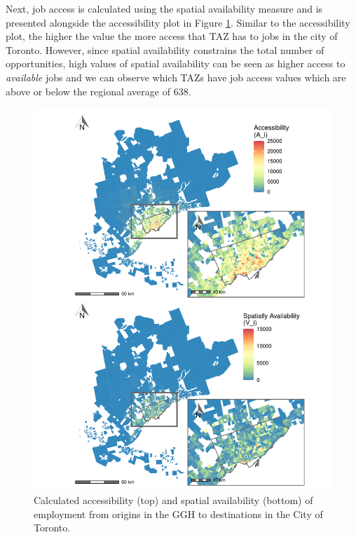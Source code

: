 \documentclass[]{elsarticle} %
\begin{document}
Next, job access is calculated using the spatial availability measure
and is presented alongside the accessibility plot in Figure
\ref{fig:plot-access-SA-Toronto-TTS}. Similar to the accessibility plot,
the higher the value the more access that TAZ has to jobs in the city of
Toronto. However, since spatial availability constrains the total number
of opportunities, high values of spatial availability can be seen as
higher access to \emph{available} jobs and we can observe which TAZs
have job access values which are above or below the regional average of
638.

\begin{figure}
\includegraphics[width=1\linewidth]{Spatial-Availability_files/figure-latex/plot-access-SA-Toronto-TTS-1} \caption{\label{fig:plot-access-SA-Toronto-TTS}Calculated accessibility (top) and spatial availability (bottom) of employment from origins in the GGH to destinations in the City of Toronto.}\label{fig:plot-access-SA-Toronto-TTS}
\end{figure}
\end{document}
